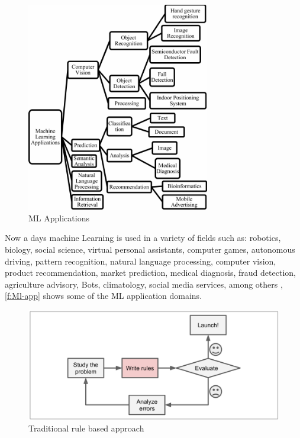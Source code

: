 \begin{figure}[t]
\centering
\includegraphics[width=8cm]{figures/Ch2/ML-Applications.png}
\caption{ML Applications \cite{Shinde_2018}}
\label{f:Ml-app}
\end{figure}

Now a days machine Learning is used in a variety of fields such as: robotics, biology, social science, virtual personal assistants, computer games, autonomous driving, pattern recognition, natural language processing, computer vision, product recommendation, market prediction, medical diagnosis, fraud detection, agriculture advisory, Bots, climatology, social media services, among others \cite{Srivastava_2019, Shinde_2018, Ray2019}, \autoref{f:Ml-app} shows some of the \ac{ML} application domains. 

\begin{figure}[h]
\centering
\includegraphics[width=\linewidth]{figures/Ch2/Tradicional-Approach.png}
\caption{Traditional rule based approach \cite{geron2017}}
\label{f:Traditional-approach}
\end{figure}

